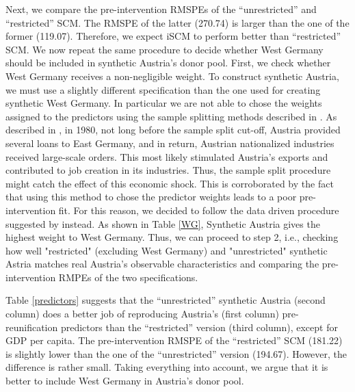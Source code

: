 Next, we compare the pre-intervention RMSPEs of the ``unrestricted'' and ``restricted'' SCM. The  RMSPE of the latter (270.74) is larger than the one of the former (119.07). Therefore, we expect iSCM to perform better than ``restricted'' SCM.
We now repeat the same procedure to decide whether West Germany should be included in  synthetic Austria's donor pool. First, we  check  whether West Germany receives a non-negligible weight.
To construct synthetic Austria, we must use a slightly different specification than the one used for creating synthetic West Germany. In particular we are not able to chose the weights assigned to the predictors using the sample splitting methods described in \cite{Aba2015}.  
As described in \cite{Geh2018}, in 1980, not long before the sample split cut-off, Austria provided several loans to East Germany, and in return, Austrian nationalized industries received large-scale orders. This most likely stimulated Austria’s exports and contributed to job creation in its industries. Thus, the sample split procedure might catch the effect of this economic shock. This is corroborated by the fact that using this method to chose the predictor weights leads to a poor pre-intervention fit. For this reason, we decided to follow the data driven procedure suggested by  \cite{Aba2010} instead. 
As shown in Table \ref{WG}, Synthetic Austria gives the highest weight to West Germany. Thus, we can proceed to step 2, i.e., checking how well "restricted" (excluding West Germany) and "unrestricted" synthetic Astria matches real Austria's observable characteristics and comparing the pre-intervention RMPEs of the two specifications.

Table \ref{predictors} 
suggests that the ``unrestricted'' synthetic Austria (second column) does a better job of reproducing Austria's (first column)  pre-reunification predictors than the ``restricted'' version (third column), except for GDP per capita. The pre-intervention RMSPE of the ``restricted'' SCM (181.22) is slightly lower than the one of the ``unrestricted'' version (194.67).  However, the difference is rather small. Taking everything into account, we argue that it is better to include West Germany in Austria's donor pool. 

